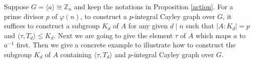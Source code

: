 \documentclass[12pt,a4paper]{article}
\def \leq {\leqslant}
\def \geq {\geqslant}
\begin{document}
	
		Suppose $G=\langle a\rangle\cong \mathbb{Z}_n$ and keep the notations in Proposition \ref{action}.
		For a prime divisor $p$ of $\varphi(n)$, to construct a $p$-integral Cayley graph over $G$, it suffices to construct a subgroup $K_d$ of $A$ for any given $d\mid n$ such that $|A:K_d|=p$ and $\langle \tau, T_d\rangle\leq K_d$.
		Next we are going to give the element $\tau$ of $A$ which maps $a$ to $a^{-1}$ first.
		Then we give a concrete example to illustrate how to construct the subgroup $K_d$ of $A$ containing $\langle \tau,T_d\rangle$ and $p$-integral Cayley graph over $G$.
		
		
		
		
		
		
		
\end{document}
